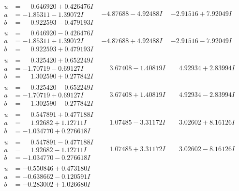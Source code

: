 \documentclass[1p]{elsarticle_modified}
\theoremstyle{definition}
\begin{document}
$$\begin{array}{c|c|c}
\begin{aligned}
u &= \phantom{-}0.646920 + 0.426476 I \\
a &= -1.85311 - 1.39072 I \\
b &= \phantom{-}0.922593 - 0.479193 I\end{aligned}
 & -4.87688 - 4.92488 I & -2.91516 + 7.92049 I \\ \hline\begin{aligned}
u &= \phantom{-}0.646920 - 0.426476 I \\
a &= -1.85311 + 1.39072 I \\
b &= \phantom{-}0.922593 + 0.479193 I\end{aligned}
 & -4.87688 + 4.92488 I & -2.91516 - 7.92049 I \\ \hline\begin{aligned}
u &= \phantom{-}0.325420 + 0.652249 I \\
a &= -1.70719 - 0.69127 I \\
b &= \phantom{-}1.302590 + 0.277842 I\end{aligned}
 & \phantom{-}3.67408 - 1.40819 I & \phantom{-}4.92934 + 2.83994 I \\ \hline\begin{aligned}
u &= \phantom{-}0.325420 - 0.652249 I \\
a &= -1.70719 + 0.69127 I \\
b &= \phantom{-}1.302590 - 0.277842 I\end{aligned}
 & \phantom{-}3.67408 + 1.40819 I & \phantom{-}4.92934 - 2.83994 I \\ \hline\begin{aligned}
u &= \phantom{-}0.547891 + 0.477188 I \\
a &= \phantom{-}1.92682 + 1.12711 I \\
b &= -1.034770 + 0.276618 I\end{aligned}
 & \phantom{-}1.07485 - 3.31172 I & \phantom{-}3.02602 + 8.16126 I \\ \hline\begin{aligned}
u &= \phantom{-}0.547891 - 0.477188 I \\
a &= \phantom{-}1.92682 - 1.12711 I \\
b &= -1.034770 - 0.276618 I\end{aligned}
 & \phantom{-}1.07485 + 3.31172 I & \phantom{-}3.02602 - 8.16126 I \\ \hline\begin{aligned}
u &= -0.550846 + 0.473180 I \\
a &= -0.638662 - 0.120591 I \\
b &= -0.283002 + 1.026680 I\end{aligned}

\end{array}$$
\end{document}
